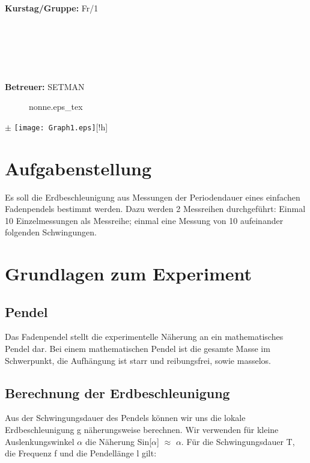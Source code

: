 \documentclass{article}
\begin{document}
\begin{verbatim}


\end{verbatim}
			\begin{flushleft}
			\textbf{\Large{Kurstag/Gruppe:}} \Large{Fr/1}
			\end{flushleft}

\begin{verbatim}






\end{verbatim}
			\begin{flushleft}
			\LARGE{\textbf{Betreuer:}}	\Large{SETMAN}	
			\end{flushleft}
		\begin{figure}[!h]
\def\svgwidth{70mm}
{nonne.eps_tex}
\end{figure}
$\pm$
\texttt{[image: Graph1.eps]}[!h]	
\section{Aufgabenstellung}
Es soll die Erdbeschleunigung aus Messungen der Periodendauer eines einfachen Fadenpendels bestimmt werden. Dazu werden 2 Messreihen durchgeführt: Einmal 10 Einzelmessungen als Messreihe; einmal eine Messung von 10 aufeinander folgenden Schwingungen.
\section{Grundlagen zum Experiment}
\subsection*{Pendel}
Das Fadenpendel stellt die experimentelle Näherung an ein mathematisches Pendel dar. Bei einem mathematischen Pendel ist die gesamte Masse im Schwerpunkt, die Aufhängung ist starr und reibungsfrei, sowie masselos.
\subsection{Berechnung der Erdbeschleunigung}
Aus der Schwingungsdauer des Pendels können wir uns die lokale Erdbeschleunigung g näherungsweise berechnen. Wir verwenden für kleine Auslenkungswinkel $\alpha$ die Näherung Sin[$\alpha$] $\approx$ $\alpha$. 
Für die Schwingungsdauer T, die Frequenz f und die Pendellänge l gilt:
\end{document}
